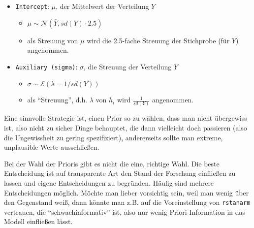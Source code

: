 \documentclass[
  a4paper,
  DIV=11]{scrreprt}
\providecommand{\tightlist}{%
  \setlength{\itemsep}{0pt}\setlength{\parskip}{0pt}}\usepackage{longtable,booktabs,array}
\theoremstyle{definition}
\theoremstyle{remark}
\begin{document}
\begin{itemize}
\tightlist
\item
  \texttt{Intercept}: \(\mu\), der Mittelwert der Verteilung \(Y\)

  \begin{itemize}
  \tightlist
  \item
    \(\mu \sim \mathcal{N}(\bar{Y}, sd(Y)\cdot 2.5)\)
  \item
    als Streuung von \(\mu\) wird die 2.5-fache Streuung der Stichprobe
    (für \(Y\)) angenommen.
  \end{itemize}
\item
  \texttt{Auxiliary\ (sigma)}: \(\sigma\), die Streuung der Verteilung
  \(Y\)

  \begin{itemize}
  \tightlist
  \item
    \(\sigma \sim \mathcal{E}(\lambda=1/sd(Y))\)
  \item
    als ``Streuung'', d.h. \(\lambda\) von \(h_i\) wird
    \(\frac{1}{sd(Y)}\) angenommen.
  \end{itemize}
\end{itemize}

Eine sinnvolle Strategie ist, einen Prior so zu wählen, dass man nicht
übergewiss ist, also nicht zu sicher Dinge behauptet, die dann
vielleicht doch passieren (also die Ungewissheit zu gering
spezifiziert), andererseits sollte man extreme, unplausible Werte
ausschließen.

\begin{tcolorbox}[enhanced jigsaw, title=\textcolor{quarto-callout-important-color}{\faExclamation}\hspace{0.5em}{Wichtig}, bottomtitle=1mm, bottomrule=.15mm, titlerule=0mm, colbacktitle=quarto-callout-important-color!10!white, colframe=quarto-callout-important-color-frame, leftrule=.75mm, left=2mm, toprule=.15mm, colback=white, arc=.35mm, breakable, toptitle=1mm, opacityback=0, rightrule=.15mm, coltitle=black, opacitybacktitle=0.6]

Bei der Wahl der Prioris gibt es nicht die eine, richtige Wahl. Die
beste Entscheidung ist auf transparente Art den Stand der Forschung
einfließen zu lassen und eigene Entscheidungen zu begründen. Häufig sind
mehrere Entscheidungen möglich. Möchte man lieber vorsichtig sein, weil
man wenig über den Gegenstand weiß, dann könnte man z.B. auf die
Voreinstellung von \texttt{rstanarm} vertrauen, die
``schwachinformativ'' ist, also nur wenig Priori-Information in das
Modell einfließen lässt.

\end{tcolorbox}
\end{document}

